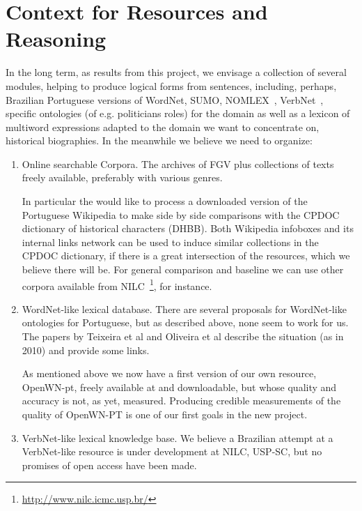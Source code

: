 \section{Context for Resources and Reasoning}

In the long term, as results from this project, we envisage a
collection of several modules, helping to produce logical forms from
sentences, including, perhaps, Brazilian Portuguese versions of
WordNet, SUMO, NOMLEX~\cite{nomlex}, VerbNet~\cite{verbnet}, specific
ontologies (of e.g. politicians roles) for the domain as well as a
lexicon of multiword expressions adapted to the domain we want to
concentrate on, historical biographies. In the meanwhile we believe we
need to organize:

\begin{enumerate}

\item Online searchable Corpora. The archives of FGV plus collections
  of texts freely available, preferably with various genres.

  In particular the would like to process a downloaded version of the
  Portuguese Wikipedia to make side by side comparisons with the CPDOC
  dictionary of historical characters (DHBB). Both Wikipedia infoboxes
  and its internal links network can be used to induce similar
  collections in the CPDOC dictionary, if there is a great
  intersection of the resources, which we believe there will be. For
  general comparison and baseline we can use other corpora available
  from NILC~\footnote{\url{http://www.nilc.icmc.usp.br/}}, for
  instance.

\item WordNet-like lexical database. There are several proposals for
  WordNet-like ontologies for Portuguese, but as described above, none
  seem to work for us. The papers by Teixeira et al and Oliveira et al
  \cite{Oliveira2008,teixeira2010} describe the situation (as in 2010)
  and provide some links.
  
  As mentioned above we now have a first version of our own resource,
  OpenWN-pt, freely available at \url{} and downloadable, but whose
  quality and accuracy is not, as yet, measured. Producing credible
  measurements of the quality of OpenWN-PT is one of our first goals
  in the new project.

\item VerbNet-like lexical knowledge base. We believe a Brazilian
  attempt at a VerbNet-like resource is under development at NILC,
  USP-SC, but no promises of open access have been made.
  

\end{enumerate}
